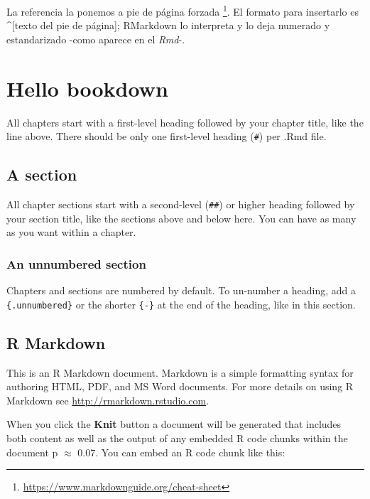 \documentclass[
  12pt,
  twoside]{book}
\theoremstyle{definition}
\theoremstyle{definition}
\theoremstyle{definition}
\theoremstyle{definition}
\theoremstyle{remark}
\begin{document}
La referencia la ponemos a pie de página forzada \footnote{\url{https://www.markdownguide.org/cheat-sheet}}. El formato para insertarlo es \^{}{[}texto del pie de página{]}; RMarkdown lo interpreta y lo deja numerado y estandarizado -como aparece en el \emph{Rmd}-.

\hypertarget{hello-bookdown}{%
\chapter*{Hello bookdown}\label{hello-bookdown}}

All chapters start with a first-level heading followed by your chapter title, like the line above. There should be only one first-level heading (\texttt{\#}) per .Rmd file.

\hypertarget{a-section}{%
\section{A section}\label{a-section}}

All chapter sections start with a second-level (\texttt{\#\#}) or higher heading followed by your section title, like the sections above and below here. You can have as many as you want within a chapter.

\hypertarget{an-unnumbered-section}{%
\subsection*{An unnumbered section}\label{an-unnumbered-section}}

Chapters and sections are numbered by default. To un-number a heading, add a \texttt{\{.unnumbered\}} or the shorter \texttt{\{-\}} at the end of the heading, like in this section.

\hypertarget{r-markdown}{%
\section{R Markdown}\label{r-markdown}}

This is an R Markdown document. Markdown is a simple formatting syntax for authoring HTML, PDF, and MS Word documents. For more details on using R Markdown see \url{http://rmarkdown.rstudio.com}.

When you click the \textbf{Knit} button a document will be generated that includes both content as well as the output of any embedded R code chunks within the document p \(\approx\) 0.07. You can embed an R code chunk like this:
\end{document}
